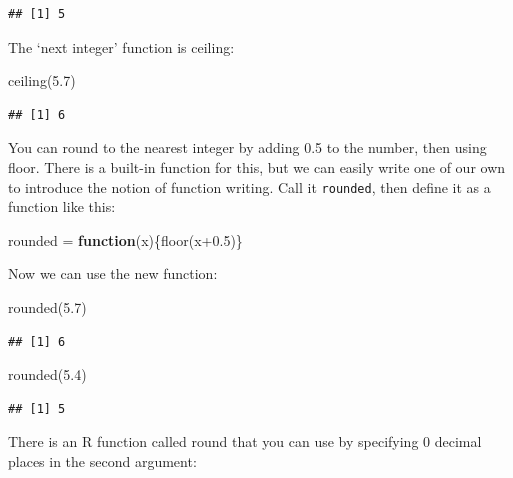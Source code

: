 \documentclass[
]{book}
\newenvironment{Shaded}{\begin{snugshade}}{\end{snugshade}}
\newcommand{\ControlFlowTok}[1]{\textcolor[rgb]{0.13,0.29,0.53}{\textbf{#1}}}
\newcommand{\FloatTok}[1]{\textcolor[rgb]{0.00,0.00,0.81}{#1}}
\newcommand{\FunctionTok}[1]{\textcolor[rgb]{0.00,0.00,0.00}{#1}}
\newcommand{\NormalTok}[1]{#1}
\newcommand{\OtherTok}[1]{\textcolor[rgb]{0.56,0.35,0.01}{#1}}
\theoremstyle{definition}
\theoremstyle{definition}
\theoremstyle{definition}
\theoremstyle{definition}
\theoremstyle{remark}
\begin{document}
\begin{verbatim}
## [1] 5
\end{verbatim}

The `next integer' function is ceiling:

\begin{Shaded}
\begin{Highlighting}[]
\FunctionTok{ceiling}\NormalTok{(}\FloatTok{5.7}\NormalTok{)}
\end{Highlighting}
\end{Shaded}

\begin{verbatim}
## [1] 6
\end{verbatim}

You can round to the nearest integer by adding 0.5 to the number, then using floor. There is a built-in function for this, but we can easily write one of our own to introduce the notion of function writing. Call it \texttt{rounded}, then define it as a function like this:

\begin{Shaded}
\begin{Highlighting}[]
\NormalTok{rounded }\OtherTok{=} \ControlFlowTok{function}\NormalTok{(x)\{}\FunctionTok{floor}\NormalTok{(x}\FloatTok{+0.5}\NormalTok{)\}}
\end{Highlighting}
\end{Shaded}

Now we can use the new function:

\begin{Shaded}
\begin{Highlighting}[]
\FunctionTok{rounded}\NormalTok{(}\FloatTok{5.7}\NormalTok{)}
\end{Highlighting}
\end{Shaded}

\begin{verbatim}
## [1] 6
\end{verbatim}

\begin{Shaded}
\begin{Highlighting}[]
\FunctionTok{rounded}\NormalTok{(}\FloatTok{5.4}\NormalTok{)}
\end{Highlighting}
\end{Shaded}

\begin{verbatim}
## [1] 5
\end{verbatim}

There is an R function called round that you can use by specifying 0 decimal places in the second
argument:
\end{document}
